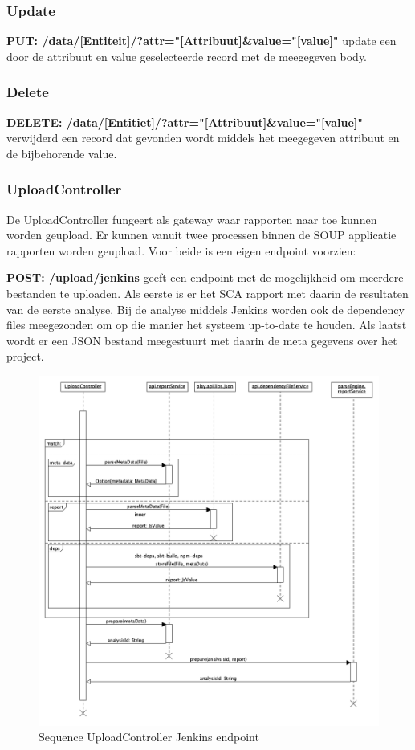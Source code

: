 \subsubsection*{Update}
\textbf{PUT: /data/[Entiteit]/?attr="[Attribuut]\&value="[value]"} update een door de attribuut en value geselecteerde record met de meegegeven body.
\subsubsection*{Delete}
\textbf{DELETE: /data/[Entitiet]/?attr="[Attribuut]\&value="[value]"} verwijderd een record dat gevonden wordt middels het meegegeven attribuut en de bijbehorende value.


\subsubsection{UploadController}\label{uploadController}
De UploadController fungeert als gateway waar rapporten naar toe kunnen worden geupload. Er kunnen vanuit twee processen binnen de SOUP applicatie rapporten worden geupload. Voor beide is een eigen endpoint voorzien:

\textbf{POST: /upload/jenkins} geeft een endpoint met de mogelijkheid om meerdere bestanden te uploaden. Als eerste is er het SCA rapport met daarin de resultaten van de eerste analyse. Bij de analyse middels Jenkins worden ook de dependency files meegezonden om op die manier het systeem up-to-date te houden. Als laatst wordt er een JSON bestand meegestuurt met daarin de meta gegevens over het project.

\begin{figure}[bth]
    \myfloatalign
    \includegraphics[width=12cm]{gfx/umlet/exports/SequploadController-Jenkins}
    \caption{Sequence UploadController Jenkins endpoint}
    \label{fig:SequenceUploadReportJenkins}
\end{figure}

